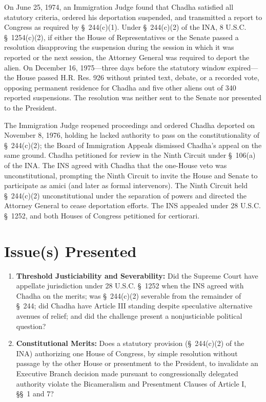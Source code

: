 \documentclass[12pt]{article}
\begin{document}
On June 25, 1974, an Immigration Judge found that Chadha satisfied all statutory criteria, ordered his deportation suspended, and transmitted a report to Congress as required by \S~244(c)(1). Under \S~244(c)(2) of the INA, 8 U.S.C. \S~1254(c)(2), if either the House of Representatives or the Senate passed a resolution disapproving the suspension during the session in which it was reported or the next session, the Attorney General was required to deport the alien. On December 16, 1975---three days before the statutory window expired---the House passed H.R. Res. 926 without printed text, debate, or a recorded vote, opposing permanent residence for Chadha and five other aliens out of 340 reported suspensions. The resolution was neither sent to the Senate nor presented to the President.

The Immigration Judge reopened proceedings and ordered Chadha deported on November 8, 1976, holding he lacked authority to pass on the constitutionality of \S~244(c)(2); the Board of Immigration Appeals dismissed Chadha's appeal on the same ground. Chadha petitioned for review in the Ninth Circuit under \S~106(a) of the INA. The INS agreed with Chadha that the one-House veto was unconstitutional, prompting the Ninth Circuit to invite the House and Senate to participate as amici (and later as formal intervenors). The Ninth Circuit held \S~244(c)(2) unconstitutional under the separation of powers and directed the Attorney General to cease deportation efforts. The INS appealed under 28 U.S.C. \S~1252, and both Houses of Congress petitioned for certiorari.

\section{Issue(s) Presented}
\begin{enumerate}
  \item \textbf{Threshold Justiciability and Severability:} Did the Supreme Court have appellate jurisdiction under 28 U.S.C. \S~1252 when the INS agreed with Chadha on the merits; was \S~244(c)(2) severable from the remainder of \S~244; did Chadha have Article III standing despite speculative alternative avenues of relief; and did the challenge present a nonjusticiable political question?
  \item \textbf{Constitutional Merits:} Does a statutory provision (\S~244(c)(2) of the INA) authorizing one House of Congress, by simple resolution without passage by the other House or presentment to the President, to invalidate an Executive Branch decision made pursuant to congressionally delegated authority violate the Bicameralism and Presentment Clauses of Article I, \S\S~1 and 7?
\end{enumerate}
\end{document}
